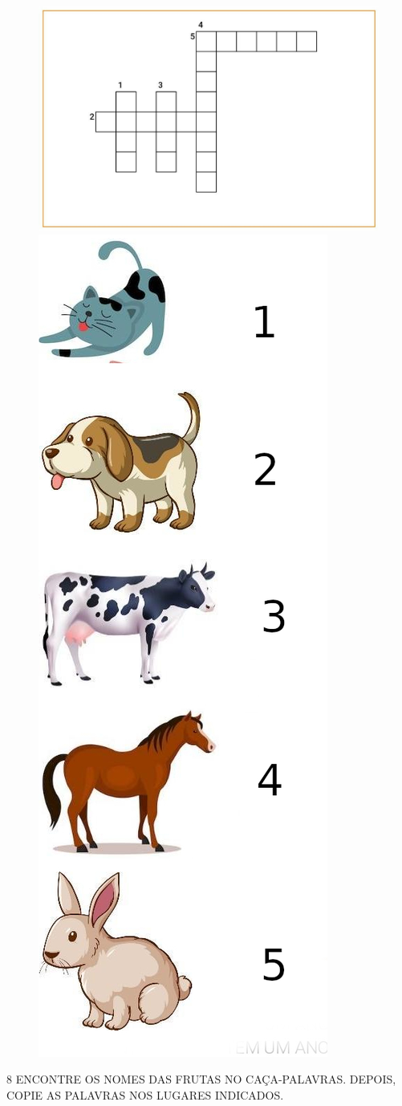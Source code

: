 \begin{figure}[htpb!]
\includegraphics[width=\textwidth]{media/image90.jpg}

\includegraphics[width=.22\textwidth]{media/image90b.jpg}
\end{figure}

\pagebreak
\num{8} ENCONTRE OS NOMES DAS FRUTAS NO CAÇA-PALAVRAS. DEPOIS, COPIE AS PALAVRAS NOS LUGARES INDICADOS.


